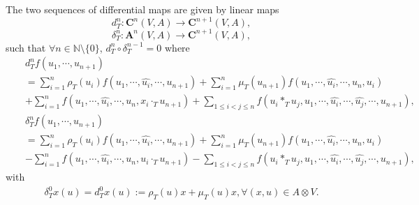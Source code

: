 \documentclass[12pt]{amsart}
\begin{document}
The two sequences of differential maps are given by
linear maps $$  d_T^{n}: \mathbf{C}^{n}(V,A)\rightarrow \mathbf{C}^{n+1}(V,A), $$
$$\delta_T^n : \mathbf{A}^{n}(V,A)\rightarrow \mathbf{C}^{n+1}(V,A),$$
such that
	$\forall n\in\mathbb{N}\setminus\{0\}$, $d_T^n\circ\delta_{T}^{n-1}=0$ where 
\begin{eqnarray}
	&& d_T^n f(u_1, \cdots, u_{n+1})\nonumber\\
	&&=\sum\limits_{i=1}^{n}\rho_T(u_i)f(u_1,\cdots,\widehat{u_i},\cdots, u_{n+1})
	+\sum\limits_{i=1}^{n}\mu_T(u_{n+1})f(u_1,\cdots,\widehat{u_i},\cdots, u_n,u_i)\nonumber\\
	&&+\sum\limits_{i=1}^{n}f(u_1,\cdots,\widehat{u_i},\cdots, u_n,x_i\cdot_T u_{n+1})
	+\sum\limits_{1\leq i< j\leq n} f(u_i\ast_T u_j, u_1, \cdots, \widehat{u_i}, \cdots, \widehat{u_j}, \cdots, u_{n+1}),\nonumber
\end{eqnarray}
\begin{eqnarray}
	&& \delta_T^n f(u_1, \cdots, u_{n+1})\nonumber\\
	&&=\sum\limits_{i=1}^{n}\rho_T(u_i)f(u_1,\cdots,\widehat{u_i},\cdots, u_{n+1})
	+\sum\limits_{i=1}^{n}\mu_T(u_{n+1})f(u_1,\cdots,\widehat{u_i},\cdots, u_n,u_i)\nonumber\\
	&&-\sum\limits_{i=1}^{n}f(u_1,\cdots,\widehat{u_i},\cdots, u_n,u_i\cdot_T u_{n+1})
	-\sum\limits_{1\leq i< j\leq n} f(u_i\ast_T u_j, u_1, \cdots, \widehat{u_i}, \cdots, \widehat{u_j}, \cdots, u_{n+1}), \nonumber
\end{eqnarray}
with \begin{eqnarray}
	\delta_T^{0}x(u)=d_T^{0}x(u):=\rho_T(u)x+\mu_T(u)x,  \forall (x,u)\in A\otimes V.
	\label{delta0}
\end{eqnarray}
\end{document}
